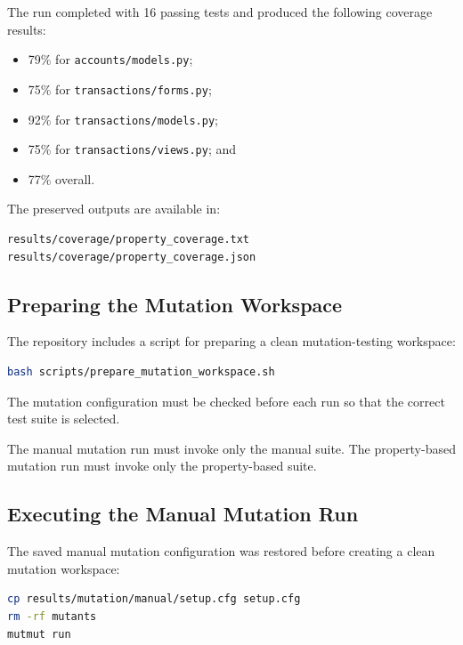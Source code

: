 \documentclass[12pt]{article}
\begin{document}
The run completed with 16 passing tests and produced the following coverage
results:

\begin{itemize}
    \item 79\% for \texttt{accounts/models.py};
    \item 75\% for \texttt{transactions/forms.py};
    \item 92\% for \texttt{transactions/models.py};
    \item 75\% for \texttt{transactions/views.py}; and
    \item 77\% overall.
\end{itemize}

The preserved outputs are available in:

\begin{verbatim}
results/coverage/property_coverage.txt
results/coverage/property_coverage.json
\end{verbatim}

\subsection{Preparing the Mutation Workspace}

The repository includes a script for preparing a clean mutation-testing
workspace:

\begin{lstlisting}[language=bash,caption={Preparing the mutation workspace}]
bash scripts/prepare_mutation_workspace.sh
\end{lstlisting}

The mutation configuration must be checked before each run so that the correct
test suite is selected.

The manual mutation run must invoke only the manual suite. The property-based
mutation run must invoke only the property-based suite.

\subsection{Executing the Manual Mutation Run}

The saved manual mutation configuration was restored before creating a clean
mutation workspace:

\begin{lstlisting}[language=bash,caption={Executing the manual mutation run}]
cp results/mutation/manual/setup.cfg setup.cfg
rm -rf mutants
mutmut run
\end{lstlisting}
\end{document}
